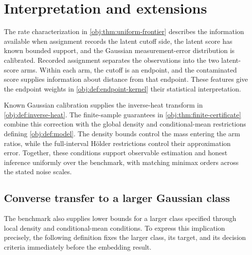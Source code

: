 \section{Interpretation and extensions}

The rate characterization in \cref{obj:thm:uniform-frontier} describes the information available when assignment records the latent cutoff side, the latent score has known bounded support, and the Gaussian measurement-error distribution is calibrated. Recorded assignment separates the observations into the two latent-score arms. Within each arm, the cutoff is an endpoint, and the contaminated score supplies information about distance from that endpoint. These features give the endpoint weights in \cref{obj:def:endpoint-kernel} their statistical interpretation.

Known Gaussian calibration supplies the inverse-heat transform in \cref{obj:def:inverse-heat}. The finite-sample guarantees in \cref{obj:thm:finite-certificate} combine this correction with the global density and conditional-mean restrictions defining \cref{obj:def:model}. The density bounds control the mass entering the arm ratios, while the full-interval Hölder restrictions control their approximation error. Together, these conditions support observable estimation and honest inference uniformly over the benchmark, with matching minimax orders across the stated noise scales.

\subsection{Converse transfer to a larger Gaussian class}

The benchmark also supplies lower bounds for a larger class specified through local density and conditional-mean conditions. To express this implication precisely, the following definition fixes the larger class, its target, and its decision criteria immediately before the embedding result.



